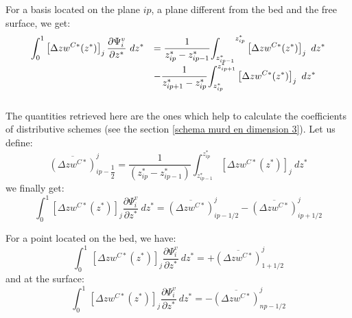 For a basis located on the plane $ip$, a plane different from the bed and
the free surface, we get:
\begin{equation}
\begin{array}{ll}
\displaystyle{\int_{0}^{1}}\left[  \Delta zw^{C\ast}(z^{\ast})\right]_{j}
\dfrac{\partial\Psi_{i}^{v}}{\partial z^{\ast}}~dz^{\ast}& =
\dfrac{1}{z_{ip}^{\ast}-z_{ip-1}^{\ast}}\displaystyle{\int_{z_{ip-1}^{\ast}}}^{z_{ip}^{\ast}}
\left[  \Delta zw^{C\ast}(z^{\ast})\right]_{j}~dz^{\ast}\\\bigskip
& -\dfrac{1}{z_{ip+1}^{\ast}-z_{ip}^{\ast}}\displaystyle{\int_{z_{ip}^{\ast}
}^{z_{ip+1}^{\ast}}}\left[  \Delta zw^{C\ast}(z^{\ast})\right]_{j}~dz^{\ast}
\end{array}
\end{equation}
The quantities retrieved here are the ones which help to calculate the
coefficients of distributive schemes (see the section
\ref{schema murd en dimension 3}).
Let us define:%
\begin{equation}
\overline{\left(  \Delta zw^{C\ast}\right)  }_{ip-\dfrac{1}{2}}^{j}=\dfrac
{1}{(z_{ip}^{\ast}-z_{ip-1}^{\ast})}\int\nolimits_{z_{ip-1}^{\ast}}%
^{z_{ip}^{\ast}}\left[  \Delta zw^{C\ast}(z^{\ast})\right]_{j}~dz^{\ast}%
\end{equation}
we finally get:%
\begin{equation}
\int\nolimits_{0}^{1}\left[\Delta zw^{C\ast}(z^{\ast})\right]_{j}
\dfrac{\partial\Psi_{i}^{v}}{\partial z^{\ast}}~dz^{\ast}=\overline{\left(
\Delta zw^{C\ast}\right)}_{ip-1/2}^{j}-\overline{\left(\Delta
zw^{C\ast}\right)}_{ip+1/2}^{j}%
\end{equation}

For a point located on the bed, we have:%
\begin{equation}
\int_{0}^{1}\,\left[  \Delta zw^{C\ast}(z^{\ast})\right]  _{j}%
\dfrac{\partial\Psi_{i}^{v}}{\partial z^{\ast}}~dz^{\ast}=+\overline{\left(
\Delta zw^{C\ast}\right)  }_{1+1/2}^{j}%
\end{equation}
and at the surface:%
\begin{equation}
\int_{0}^{1}\,\left[  \Delta zw^{C\ast}(z^{\ast})\right]  _{j}%
\dfrac{\partial\Psi_{i}^{v}}{\partial z^{\ast}}~dz^{\ast}=-\overline{\left(
\Delta zw^{C\ast}\right)  }_{np-1/2}^{j}%
\end{equation}

